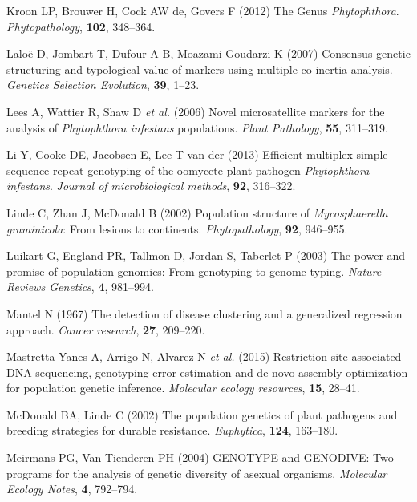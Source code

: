 \documentclass[double,12pt]{beavtex}
\begin{document}
  \hypertarget{ref-kroon2012genus}{}
  Kroon LP, Brouwer H, Cock AW de, Govers F (2012) The Genus
  \emph{Phytophthora}. \emph{Phytopathology}, \textbf{102}, 348--364.
  
  \hypertarget{ref-laloe2007consensus}{}
  Laloë D, Jombart T, Dufour A-B, Moazami-Goudarzi K (2007) Consensus
  genetic structuring and typological value of markers using multiple
  co-inertia analysis. \emph{Genetics Selection Evolution}, \textbf{39},
  1--23.
  
  \hypertarget{ref-lees2006novel}{}
  Lees A, Wattier R, Shaw D \emph{et al.} (2006) Novel microsatellite
  markers for the analysis of \emph{Phytophthora infestans} populations.
  \emph{Plant Pathology}, \textbf{55}, 311--319.
  
  \hypertarget{ref-li2013efficient}{}
  Li Y, Cooke DE, Jacobsen E, Lee T van der (2013) Efficient multiplex
  simple sequence repeat genotyping of the oomycete plant pathogen
  \emph{Phytophthora infestans}. \emph{Journal of microbiological
  methods}, \textbf{92}, 316--322.
  
  \hypertarget{ref-linde2002population}{}
  Linde C, Zhan J, McDonald B (2002) Population structure of
  \emph{Mycosphaerella graminicola}: From lesions to continents.
  \emph{Phytopathology}, \textbf{92}, 946--955.
  
  \hypertarget{ref-luikart2003power}{}
  Luikart G, England PR, Tallmon D, Jordan S, Taberlet P (2003) The power
  and promise of population genomics: From genotyping to genome typing.
  \emph{Nature Reviews Genetics}, \textbf{4}, 981--994.
  
  \hypertarget{ref-mantel1967detection}{}
  Mantel N (1967) The detection of disease clustering and a generalized
  regression approach. \emph{Cancer research}, \textbf{27}, 209--220.
  
  \hypertarget{ref-mastretta2015restriction}{}
  Mastretta-Yanes A, Arrigo N, Alvarez N \emph{et al.} (2015) Restriction
  site-associated DNA sequencing, genotyping error estimation and de novo
  assembly optimization for population genetic inference. \emph{Molecular
  ecology resources}, \textbf{15}, 28--41.
  
  \hypertarget{ref-Mcdonald2002}{}
  McDonald BA, Linde C (2002) The population genetics of plant pathogens
  and breeding strategies for durable resistance. \emph{Euphytica},
  \textbf{124}, 163--180.
  
  \hypertarget{ref-meirmans2004genotype}{}
  Meirmans PG, Van Tienderen PH (2004) GENOTYPE and GENODIVE: Two programs
  for the analysis of genetic diversity of asexual organisms.
  \emph{Molecular Ecology Notes}, \textbf{4}, 792--794.
  
\end{document}
